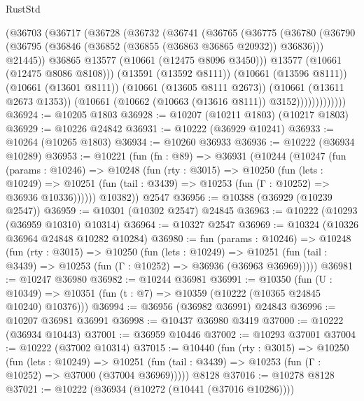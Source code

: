 \begin{lexlean}{RustStd}
\begin{coremodule}
                (@36703
                  (@36717
                    (@36728
                      (@36732
                        (@36741
                          (@36765
                            (@36775
                              (@36780
                                (@36790
                                  (@36795 (@36846 (@36852 (@36855 (@36863 @36865 @20932)) @36836)))
                                  @21445))
                              @36865
                              @13577
                              (@10661 (@12475 @8096 @3450)))
                            @13577
                            (@10661 (@12475 @8086 @8108)))
                          (@13591 (@13592 @8111))
                          (@10661 (@13596 @8111))
                          (@10661 (@13601 @8111))
                          (@10661 (@13605 @8111 @2673))
                          (@10661 (@13611 @2673 @1353))
                          (@10661 (@10662 (@10663 (@13616 @8111)) @3152)))))))))))))
@36924 := @10205 @1803
@36928 := @10207 (@10211 @1803) (@10217 @1803)
@36929 := @10226 @24842
@36931 := @10222 (@36929 @10241)
@36933 := @10264 (@10265 @1803)
@36934 := @10260 @36933
@36936 := @10222 (@36934 @10289)
@36953 := @10221
    (fun (fn : @89) =>
    @36931
      (@10244
        (@10247
          (fun (params : @10246) =>
          @10248
            (fun (rty : @3015) =>
            @10250
              (fun (lets : @10249) =>
              @10251 (fun (tail : @3439) => @10253 (fun (Γ : @10252) => @36936 @10336))))))
        @10382))
    @2547
@36956 := @10388 (@36929 (@10239 @2547))
@36959 := @10301 (@10302 @2547) @24845
@36963 := @10222 (@10293 (@36959 @10310) @10314)
@36964 := @10327 @2547
@36969 := @10324 (@10326 @36964 @24848 @10282 @10284)
@36980 := fun (params : @10246) =>
  @10248
    (fun (rty : @3015) =>
    @10250
      (fun (lets : @10249) =>
      @10251 (fun (tail : @3439) => @10253 (fun (Γ : @10252) => @36936 (@36963 @36969)))))
@36981 := @10247 @36980
@36982 := @10244 @36981
@36991 := @10350
    (fun (U : @10349) => @10351 (fun (t : @7) => @10359 (@10222 (@10365 @24845 @10240) @10376)))
@36994 := @36956 (@36982 @36991) @24843
@36996 := @10207 @36981 @36991
@36998 := @10437 @36980 @3419
@37000 := @10222 (@36934 @10443)
@37001 := @36959 @10446
@37002 := @10293 @37001
@37004 := @10222 (@37002 @10314)
@37015 := @10440
    (fun (rty : @3015) =>
    @10250
      (fun (lets : @10249) =>
      @10251 (fun (tail : @3439) => @10253 (fun (Γ : @10252) => @37000 (@37004 @36969)))))
    @8128
@37016 := @10278 @8128
@37021 := @10222 (@36934 (@10272 (@10441 (@37016 @10286))))

\end{coremodule}
\end{lexlean}
